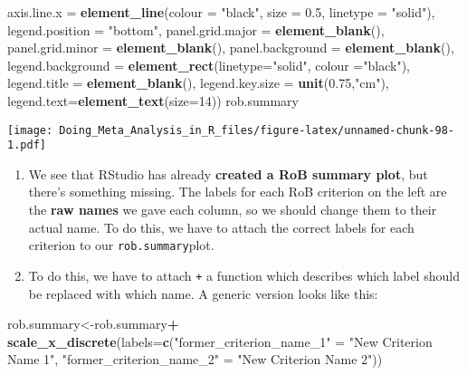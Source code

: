 \documentclass[]{book}
\newenvironment{Shaded}{\begin{snugshade}}{\end{snugshade}}
\newcommand{\KeywordTok}[1]{\textcolor[rgb]{0.13,0.29,0.53}{\textbf{#1}}}
\newcommand{\DataTypeTok}[1]{\textcolor[rgb]{0.13,0.29,0.53}{#1}}
\newcommand{\DecValTok}[1]{\textcolor[rgb]{0.00,0.00,0.81}{#1}}
\newcommand{\FloatTok}[1]{\textcolor[rgb]{0.00,0.00,0.81}{#1}}
\newcommand{\StringTok}[1]{\textcolor[rgb]{0.31,0.60,0.02}{#1}}
\newcommand{\OperatorTok}[1]{\textcolor[rgb]{0.81,0.36,0.00}{\textbf{#1}}}
\newcommand{\NormalTok}[1]{#1}
\theoremstyle{definition}
\theoremstyle{definition}
\theoremstyle{definition}
\theoremstyle{remark}
\begin{document}
\begin{Shaded}
\begin{Highlighting}[]
        \DataTypeTok{axis.line.x =} \KeywordTok{element_line}\NormalTok{(}\DataTypeTok{colour =} \StringTok{"black"}\NormalTok{, }
                                 \DataTypeTok{size =} \FloatTok{0.5}\NormalTok{, }\DataTypeTok{linetype =} \StringTok{"solid"}\NormalTok{),}
        \DataTypeTok{legend.position =} \StringTok{"bottom"}\NormalTok{,}
        \DataTypeTok{panel.grid.major =} \KeywordTok{element_blank}\NormalTok{(), }
        \DataTypeTok{panel.grid.minor =} \KeywordTok{element_blank}\NormalTok{(),}
        \DataTypeTok{panel.background =} \KeywordTok{element_blank}\NormalTok{(),}
        \DataTypeTok{legend.background =} \KeywordTok{element_rect}\NormalTok{(}\DataTypeTok{linetype=}\StringTok{"solid"}\NormalTok{, }
                                         \DataTypeTok{colour =}\StringTok{"black"}\NormalTok{),}
        \DataTypeTok{legend.title =} \KeywordTok{element_blank}\NormalTok{(),}
        \DataTypeTok{legend.key.size =} \KeywordTok{unit}\NormalTok{(}\FloatTok{0.75}\NormalTok{,}\StringTok{"cm"}\NormalTok{),}
        \DataTypeTok{legend.text=}\KeywordTok{element_text}\NormalTok{(}\DataTypeTok{size=}\DecValTok{14}\NormalTok{))}
\NormalTok{rob.summary}
\end{Highlighting}
\end{Shaded}

\texttt{[image: Doing\_Meta\_Analysis\_in\_R\_files/figure-latex/unnamed-chunk-98-1.pdf]}

\begin{enumerate}
\def\labelenumi{\arabic{enumi}.}
\setcounter{enumi}{3}
\item
  We see that RStudio has already \textbf{created a RoB summary plot},
  but there's something missing. The labels for each RoB criterion on
  the left are the \textbf{raw names} we gave each column, so we should
  change them to their actual name. To do this, we have to attach the
  correct labels for each criterion to our \texttt{rob.summary}plot.
\item
  To do this, we have to attach \texttt{+} a function which describes
  which label should be replaced with which name. A generic version
  looks like this:
\end{enumerate}

\begin{Shaded}
\begin{Highlighting}[]
\NormalTok{rob.summary<-rob.summary}\OperatorTok{+}
\StringTok{  }\KeywordTok{scale_x_discrete}\NormalTok{(}\DataTypeTok{labels=}\KeywordTok{c}\NormalTok{(}\StringTok{"former_criterion_name_1"}\NormalTok{ =}\StringTok{ "New Criterion Name 1"}\NormalTok{, }
                            \StringTok{"former_criterion_name_2"}\NormalTok{ =}\StringTok{ "New Criterion Name 2"}\NormalTok{))}
\end{Highlighting}
\end{Shaded}
\end{document}
